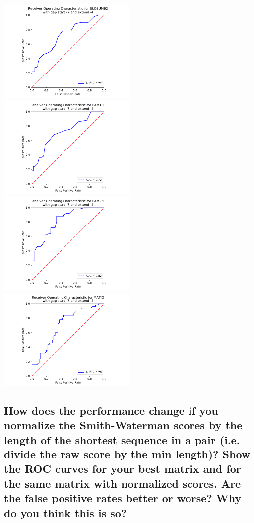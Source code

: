 \documentclass[]{article}
\begin{document}
\vspace{1em}
\includegraphics[width=0.5\textwidth]{../BMI203_HW3_alignment/plots/ROC_blosum62.pdf}
\includegraphics[width=0.5\textwidth]{../BMI203_HW3_alignment/plots/ROC_PAM100.pdf}
\includegraphics[width=0.5\textwidth]{../BMI203_HW3_alignment/plots/ROC_PAM250.pdf}
\includegraphics[width=0.5\textwidth]{../BMI203_HW3_alignment/plots/ROC_MATIO.pdf}
\vspace{1em}


\subsection{How does the performance change if you normalize the Smith-Waterman scores by the length of the shortest sequence in a pair (i.e. divide the raw score by the min length)? Show the ROC curves for your best matrix and for the same matrix with normalized scores. Are the false positive rates better or worse? Why do you think this is so?}
\end{document}
